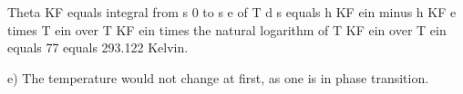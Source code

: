 Theta KF equals integral from s 0 to s e of T d s equals h KF ein minus h KF e times T ein over T KF ein times the natural logarithm of T KF ein over T ein equals 77 equals 293.122 Kelvin.

e) The temperature would not change at first, as one is in phase transition.